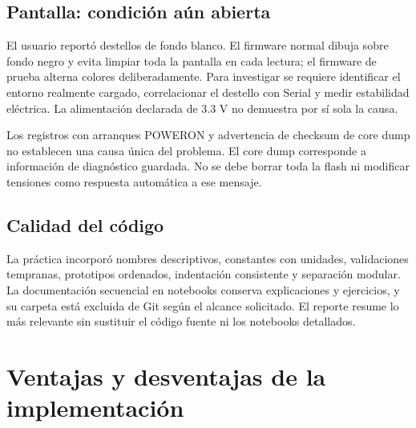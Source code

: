 \documentclass[11pt,a4paper]{article}
\newcommand{\nextsection}[1]{\clearpage\section{#1}}
\begin{document}
\subsection{Pantalla: condición aún abierta}
El usuario reportó destellos de fondo blanco. El firmware normal dibuja sobre fondo negro y evita limpiar toda la pantalla en cada lectura; el firmware de prueba alterna colores deliberadamente. Para investigar se requiere identificar el entorno realmente cargado, correlacionar el destello con Serial y medir estabilidad eléctrica. La alimentación declarada de 3.3 V no demuestra por sí sola la causa.

Los registros con arranques POWERON y advertencia de checksum de core dump no establecen una causa única del problema. El core dump corresponde a información de diagnóstico guardada.\cite{coredump} No se debe borrar toda la flash ni modificar tensiones como respuesta automática a ese mensaje.

\subsection{Calidad del código}
La práctica incorporó nombres descriptivos, constantes con unidades, validaciones tempranas, prototipos ordenados, indentación consistente y separación modular. La documentación secuencial en notebooks conserva explicaciones y ejercicios, y su carpeta está excluida de Git según el alcance solicitado. El reporte resume lo más relevante sin sustituir el código fuente ni los notebooks detallados.

\nextsection{Ventajas y desventajas de la implementación}
\end{document}
